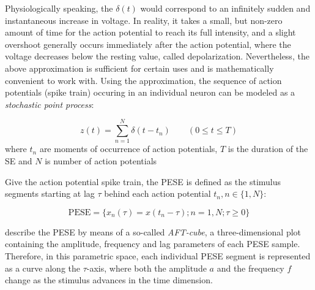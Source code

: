 Physiologically speaking, the $\delta(t)$ would correspond to an infinitely sudden and instantaneous increase in voltage. In reality, it takes a small, but non-zero amount of time for the action potential to reach its full intensity, and a slight overshoot generally occurs immediately after the action potential, where the voltage decreases below the resting value, called depolarization. Nevertheless, the above approximation is sufficient for certain uses and is mathematically convenient to work with. Using the approximation, the sequence of action potentials (spike train) occuring in an individual neuron can be modeled as a \emph{stochastic point process}:

\begin{equation}
	z(t) = \sum_{n=1}^N \delta(t - t _n) \qquad (0 \leq t \leq T)
\end{equation}
\noindent where $t_n$ are moments of occurrence of action potentials, $T$ is the duration of the SE and $N$ is number of action potentials

Give the action potential spike train, the PESE is defined as the stimulus segments starting at lag $\tau$ behind each action potential $t_n, n \in \{1, N\}$:

\begin{equation}
	\mathrm{PESE} = \{x_n(\tau) = x(t_n - \tau); n = 1, N; \tau \geq 0\}
\end{equation}


\textcite{aertsenSpectrotemporalReceptiveFields1980} describe the PESE by means of a so-called \emph{AFT-cube}, a three-dimensional plot containing the amplitude, frequency and lag parameters of each PESE sample. Therefore, in this parametric space, each individual PESE segment is represented as a curve along the $\tau$-axis, where both the amplitude $a$ and the frequency $f$ change as the stimulus advances in the time dimension.

